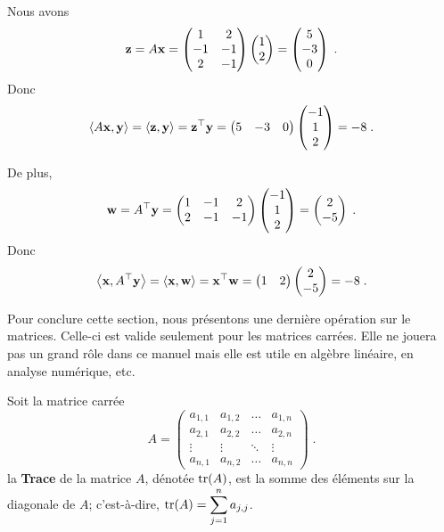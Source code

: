 {\begin{egg}
Nous avons
\[
\mathbf{z} = A\mathbf{x} = \begin{pmatrix} 1 & 2 \\ -1 & -1 \\ 2 & -1 \end{pmatrix}
\begin{pmatrix} 1 \\ 2 \end{pmatrix} =
\begin{pmatrix}  5 \\ -3 \\ 0 \end{pmatrix} \; .
\]
Donc
\[
\left\langle{A\mathbf{x}} , {\mathbf{y}}\right\rangle = \left\langle{\mathbf{z}} , {\mathbf{y}}\right\rangle
= \mathbf{z}^\top \mathbf{y} =
\begin{pmatrix}  5 & -3 & 0 \end{pmatrix}
\begin{pmatrix} -1 \\ 1 \\ 2 \end{pmatrix}
= -8 \; .
\]

De plus,
\[
\mathbf{w} = A^\top\mathbf{y} =
\begin{pmatrix} 1 & -1 & 2 \\  2 & -1 & -1 \end{pmatrix}
\begin{pmatrix} -1 \\ 1 \\ 2 \end{pmatrix} =
\begin{pmatrix}  2 \\ -5 \end{pmatrix} \; .
\]
Donc
\[
\left\langle{\mathbf{x}} , {A^\top\mathbf{y}}\right\rangle = \left\langle{\mathbf{x}} , {\mathbf{w}}\right\rangle
= \mathbf{x}^\top \mathbf{w} =
\begin{pmatrix} 1 & 2 \end{pmatrix}
\begin{pmatrix} 2 \\ -5 \end{pmatrix}
= -8 \; .
\]
\end{egg}

Pour conclure cette section, nous présentons une dernière opération sur
le matrices.  Celle-ci est valide seulement pour les matrices carrées.
Elle ne jouera pas un grand rôle dans ce manuel mais elle est utile en
algèbre linéaire, en analyse numérique, etc.

\begin{focus}{\dfn} 
Soit la matrice carrée
\[
A =
\begin{pmatrix}
a_{1,1} & a_{1,2} &\ldots & a_{1,n} \\
a_{2,1} & a_{2,2} & \ldots & a_{2,n} \\
\vdots & \vdots & \ddots & \vdots \\
a_{n,1} & a_{n,2} & \ldots & a_{n,n}
\end{pmatrix} \; .
\]
la {\bfseries Trace} de la matrice $A$, dénotée $\operatorname{tr}(A)$, est la somme
des éléments sur la diagonale de $A$; c'est-à-dire,
$\displaystyle \operatorname{tr}(A) = \sum_{j=1}^n a_{j,j}$.
\end{focus}

}

